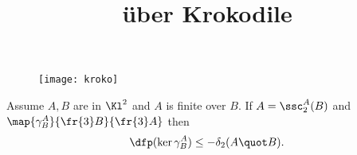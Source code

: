 \documentclass[a4paper,11pt,german,english]{article}
\title{\"uber Krokodile}
\begin{document}
\maketitle
\begin{figure}[hbt]
\centering\texttt{[image: kroko]}
\end{figure}
\bigskip
\begin{lem*}
Assume $A,B$ are in $\Kl^{2}$ and $A$ is finite over $B$. If $A=\ssc^{A}_{2}(B)$ and $\map{\gamma_{B}^{A}}{\fr{3}B}{\fr{3}A}$
then $$\dfp(\ker\gamma_{B}^{A})\leq-\delta_{2}(A\quot B).$$
\end{lem*}
\end{document}
